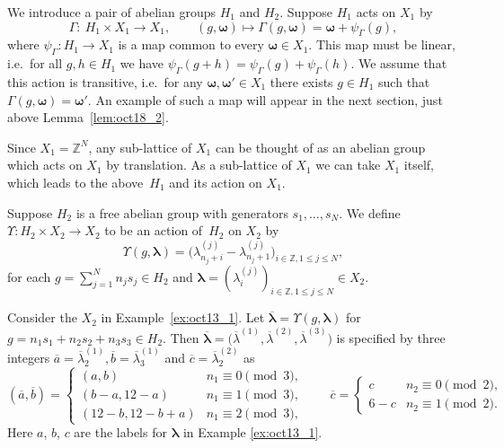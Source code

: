 \documentclass[pdftex]{sigma}
\newcommand{\Z}{{\mathbb Z}}
\newcommand\bom{\boldsymbol{\omega}}
\newcommand\bol{\boldsymbol{\lambda}}
\begin{document}
We introduce a pair of abelian groups $H_1$ and $H_2$.
Suppose $H_1$ acts on $X_1$
by
\begin{displaymath}
\varGamma : \ H_1 \times X_1 \rightarrow X_1, \qquad
(g , \bom) \mapsto \varGamma (g , \bom) = \bom + \psi_{\varGamma} (g),
\end{displaymath}
where $\psi_{\varGamma}: H_1 \rightarrow X_1$ is a map common to every $\bom \in X_1$.
This map must be linear, i.e.~for all $g, h \in H_1$ we have $\psi_{\varGamma}(g+h) = \psi_{\varGamma}(g) + \psi_{\varGamma}(h)$.
We assume that this action is transitive, i.e.~for any $\bom, \bom' \in X_1$ there exists $g \in H_1$ such that $\varGamma (g , \bom) = \bom'$.
An example of such a map will appear in the next section, just above Lemma~\ref{lem:oct18_2}.
\begin{remark}
Since $X_1 = \Z^N$, any sub-lattice of $X_1$ can be thought of as an abelian group which
acts on $X_1$ by translation.
As a sub-lattice of $X_1$ we can take $X_1$ itself, which leads to the above~$H_1$ and its action on $X_1$.
\end{remark}

Suppose $H_2$ is a free abelian group with generators $s_1, \ldots , s_N$.
We def\/ine $\Upsilon: H_2 \times X_2 \rightarrow X_2$ to be an action of~$H_2$ on $X_2$ by
\begin{equation}\label{eq:mar24_1}
\Upsilon (g,\bol) = \big(\lambda^{(j)}_{n_j + i}- \lambda^{(j)}_{n_j + 1}\big)_{i \in \Z, 1 \leq j \leq N},
\end{equation}
for each $g = \sum_{j=1}^N n_j s_j\in H_2$ and
$\bol = (\lambda^{(j)}_i)_{i \in \Z, 1 \leq j \leq N} \in X_2$.

\begin{example}\label{ex:oct15_1}
Consider the $X_2$ in Example~\ref{ex:oct13_1}.
Let $\overline{\bol} = \Upsilon (g,\bol)$
for $g = n_1 s_1 + n_2 s_2 + n_3 s_3 \in H_2$.
Then
$\overline{\bol} = \big(\overline{\lambda}^{(1)}, \overline{\lambda}^{(2)},\overline{\lambda}^{(3)}\big)$ is specif\/ied by three integers
$\overline{a}=\overline{\lambda}^{(1)}_2, \overline{b}=\overline{\lambda}^{(1)}_3$
and $\overline{c}=\overline{\lambda}^{(2)}_2$ as
\begin{equation*}
(\overline{a}, \overline{b}) =
\begin{cases}
(a,b) & n_1 \equiv 0 \pmod{3},\\
(b-a, 12-a) & n_1 \equiv 1 \pmod{3},\\
(12-b, 12-b+a) & n_1 \equiv 2 \pmod{3},
\end{cases}
\qquad
\overline{c} =
\begin{cases}
c & n_2 \equiv 0 \pmod{2},\\
6-c & n_2 \equiv 1 \pmod{2}.
\end{cases}
\end{equation*}
Here $a$, $b$, $c$ are the labels for $\bol$ in Example \ref{ex:oct13_1}.
\end{example}
\end{document}
